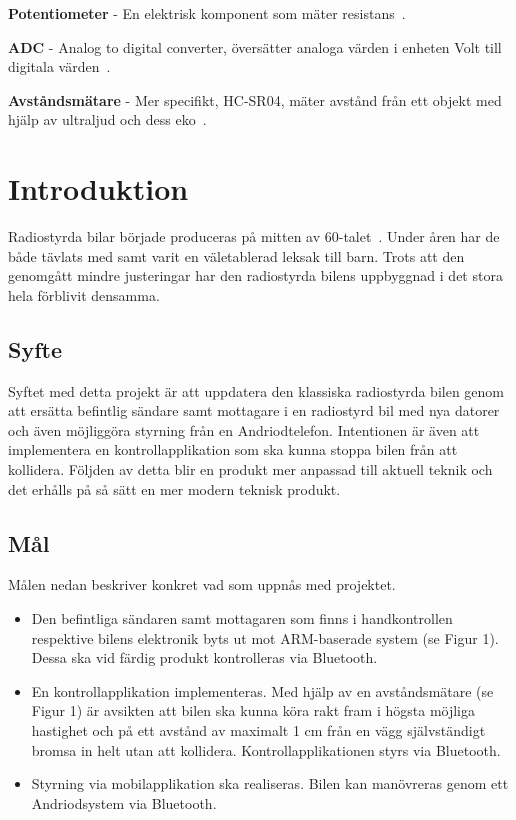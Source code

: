 \documentclass[a4paper]{article}
\begin{document}
\vspace{5mm} \noindent
{\bf Potentiometer} - En elektrisk komponent som mäter resistans~\cite{Potentiometer}.

\vspace{5mm} \noindent
{\bf ADC} - Analog to digital converter, översätter analoga värden i enheten Volt till digitala värden~\cite{ADC}.

\vspace{5mm} \noindent
{\bf Avståndsmätare} - Mer specifikt, HC-SR04, mäter avstånd från ett objekt med hjälp av ultraljud och dess eko~\cite{DistMeasure}.






\newpage
\section{Introduktion}

Radiostyrda bilar började produceras på mitten av 60-talet~\cite{RCHistory}. Under åren har de både tävlats med samt varit en väletablerad leksak till barn. Trots att den genomgått mindre justeringar har den radiostyrda bilens uppbyggnad i det stora hela förblivit densamma.

\subsection{Syfte}

Syftet med detta projekt är att uppdatera den klassiska radiostyrda bilen genom att ersätta befintlig sändare samt mottagare i en radiostyrd bil med nya datorer och även möjliggöra styrning från en Andriodtelefon. Intentionen är även att implementera en kontrollapplikation som ska kunna stoppa bilen från att kollidera. Följden av detta blir en produkt mer anpassad till aktuell teknik och det erhålls på så sätt en mer modern teknisk produkt.



\subsection{Mål}
Målen nedan beskriver konkret vad som uppnås med projektet.

\begin{itemize}
\item Den befintliga sändaren samt mottagaren som finns i handkontrollen respektive bilens elektronik byts ut mot ARM-baserade system (se Figur 1). Dessa ska vid färdig produkt kontrolleras via Bluetooth.
\item En kontrollapplikation implementeras. Med hjälp av en avståndsmätare (se Figur 1) är avsikten att bilen ska kunna köra rakt fram i högsta möjliga hastighet och på ett avstånd av maximalt 1 cm från en vägg självständigt bromsa in helt utan att kollidera. Kontrollapplikationen styrs via Bluetooth.
\item Styrning via mobilapplikation ska realiseras. Bilen kan manövreras genom ett Andriodsystem via Bluetooth.
\end{itemize}
\end{document}
